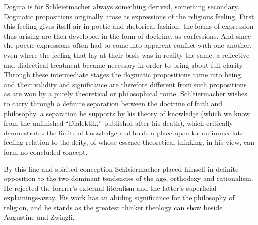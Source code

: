 \documentclass[12pt,a4paper]{book}
\newcommand{\opage}[1]{\marginnote{\footnotesize\textit{[#1]}}}
\begin{document}
Dogma is for Schleiermacher always something derived, something
secondary. Dogmatic propositions originally arose as expressions of the
religious feeling. First this feeling gives itself air in poetic and
rhetorical fashion; the forms of expression thus arising are then
developed in the form of doctrine, as confessions. And since the poetic
expressions often had to come into apparent conflict with one another,
even where the feeling that lay at their basis was in reality the same, a
reflective and dialectical treatment became necessary in order to bring
about full clarity. Through these intermediate stages the dogmatic
propositions came into being, and their validity and significance are
therefore different from such propositions as are won by a purely
theoretical or philosophical route. Schleiermacher wishes to carry
through a definite separation between the doctrine of faith and
philosophy, a separation he supports by his theory of knowledge (which we
know from the unfinished ``Dialektik,'' published after his death), which
critically demonstrates the limits of knowledge and holds a place open
for an immediate feeling-relation to the deity, of whose
\opage{8}essence theoretical thinking, in his view, can form no concluded
concept.

By this fine and spirited conception Schleiermacher placed himself in
definite opposition to the two dominant tendencies of the age, orthodoxy
and rationalism. He rejected the former's external literalism and the
latter's superficial explainings-away. His work has an abiding
significance for the philosophy of religion, and he stands as the
greatest thinker theology can show beside Augustine and Zwingli.
\end{document}
